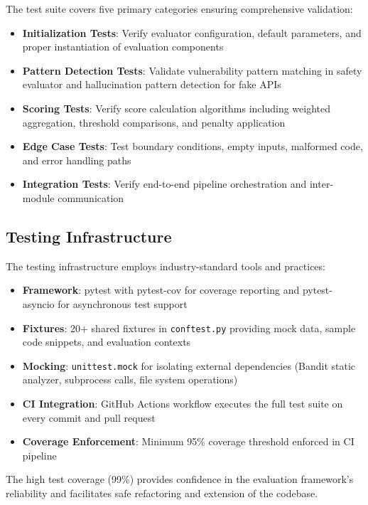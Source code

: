\documentclass[12pt,a4paper]{article}
\begin{document}
The test suite covers five primary categories ensuring comprehensive validation:

\begin{itemize}
    \item \textbf{Initialization Tests}: Verify evaluator configuration, default parameters, and proper instantiation of evaluation components
    \item \textbf{Pattern Detection Tests}: Validate vulnerability pattern matching in safety evaluator and hallucination pattern detection for fake APIs
    \item \textbf{Scoring Tests}: Verify score calculation algorithms including weighted aggregation, threshold comparisons, and penalty application
    \item \textbf{Edge Case Tests}: Test boundary conditions, empty inputs, malformed code, and error handling paths
    \item \textbf{Integration Tests}: Verify end-to-end pipeline orchestration and inter-module communication
\end{itemize}

\subsection{Testing Infrastructure}

The testing infrastructure employs industry-standard tools and practices:

\begin{itemize}
    \item \textbf{Framework}: pytest with pytest-cov for coverage reporting and pytest-asyncio for asynchronous test support
    \item \textbf{Fixtures}: 20+ shared fixtures in \texttt{conftest.py} providing mock data, sample code snippets, and evaluation contexts
    \item \textbf{Mocking}: \texttt{unittest.mock} for isolating external dependencies (Bandit static analyzer, subprocess calls, file system operations)
    \item \textbf{CI Integration}: GitHub Actions workflow executes the full test suite on every commit and pull request
    \item \textbf{Coverage Enforcement}: Minimum 95\% coverage threshold enforced in CI pipeline
\end{itemize}

The high test coverage (99\%) provides confidence in the evaluation framework's reliability and facilitates safe refactoring and extension of the codebase.
\end{document}
